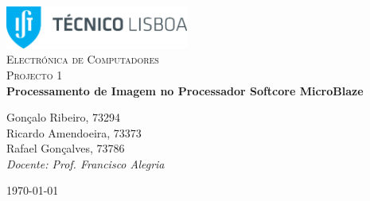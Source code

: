 \begin{titlepage}

	\begin{center}

		\includegraphics[width=6cm]{./title}\\[3cm]

		\textsc{\LARGE Electrónica de Computadores}\\[1.5cm]

		\textsc{\Large Projecto 1}\\[1.5cm]


		{ \huge \bfseries Processamento de Imagem no Processador Softcore MicroBlaze\\[2.5cm] }


		\noindent
		\begin{center} \large
			Gonçalo Ribeiro, 73294\\[5mm]

			Ricardo Amendoeira, 73373\\[5mm]

			Rafael Gonçalves, 73786\\[2.5cm]

			\textit{Docente: Prof. Francisco Alegria}

		\end{center}

		\vfill

		{\large \today}

	\end{center}

\end{titlepage}